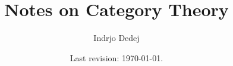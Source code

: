 



\title{Notes on Category Theory}
\author{Indrjo Dedej}
\date{Last revision: \today{}.}





\cleardoublepage

\tableofcontents
\restoregeometry



\printbibliography



